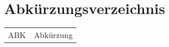
\section{Abkürzungsverzeichnis}

\begin{longtable}{p{6 cm}p{9 cm}}
    ABK & Abkürzung \\
\end{longtable}

   